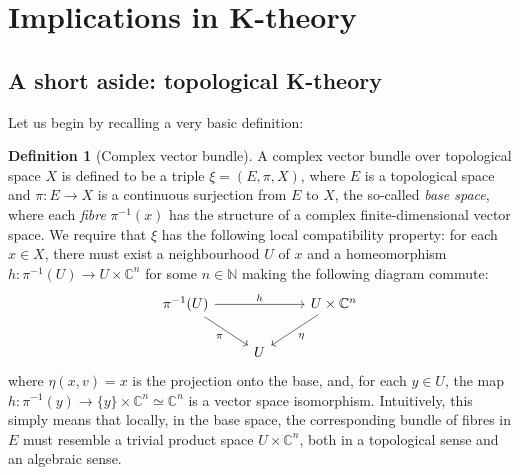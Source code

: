 \documentclass[aps,pra,showpacs,notitlepage,onecolumn,superscriptaddress,nofootinbib]{revtex4-1}
\theoremstyle{definition}
\newtheorem{definition}{Definition}[section]
\begin{document}
\section{Implications in K-theory}

\subsection{A short aside: topological K-theory}

\noindent Let us begin by recalling a very basic definition:

\begin{definition}[Complex vector bundle]
  A complex vector bundle over topological space $X$ is defined to be a triple $\xi = (E, \pi, X)$, where $E$ is a topological space and $\pi : E \rightarrow X$ is a continuous surjection
  from $E$ to $X$, the so-called \emph{base space}, where each \emph{fibre} $\pi^{-1}(x)$ has the structure of a complex finite-dimensional vector space. We require that $\xi$ has the following
  local compatibility property: for each $x \in X$, there must exist a neighbourhood $U$ of $x$ and a homeomorphism $h : \pi^{-1}(U) \rightarrow U \times \mathbb{C}^n$ for some $n \in \mathbb{N}$
  making the following diagram commute:
  \[\begin{tikzcd}
	          {\pi^{-1}(U)} && {U \times \mathbb{C}^{n}} \\
	          & U
	          \arrow["h", from=1-1, to=1-3]
	          \arrow["\pi"', from=1-1, to=2-2]
	          \arrow["\eta", from=1-3, to=2-2]
  \end{tikzcd}\]
  where $\eta(x, v) = x$ is the projection onto the base, and, for each $y \in U$, the map $h : \pi^{-1}(y) \rightarrow \{y\} \times \mathbb{C}^n \simeq \mathbb{C}^n$ is a vector
  space isomorphism. Intuitively, this simply means that locally, in the base space, the corresponding bundle of fibres in $E$ must resemble a trivial product space $U \times \mathbb{C}^n$,
  both in a topological sense and an algebraic sense.
\end{definition}
\end{document}
